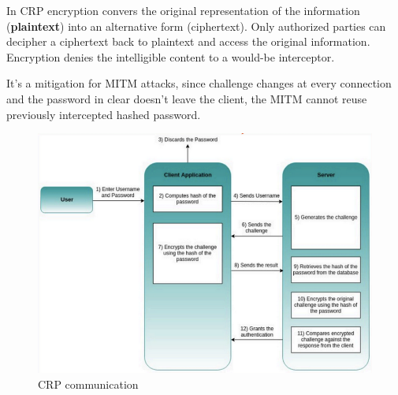     \FloatBarrier   
    
    In CRP encryption convers the original representation of the information (\textbf{plaintext}) into an alternative form (ciphertext). Only authorized parties can decipher a ciphertext back to plaintext and access the original information. Encryption denies the intelligible content to a would-be interceptor.
    
    It's a mitigation for MITM attacks, since challenge changes at every connection and the password in clear doesn't leave the client, the MITM cannot reuse previously intercepted hashed password.
    
    \begin{figure}[h!]
        \centering
        \includegraphics[scale=0.4]{images/CRP.png}
        \caption{CRP communication}
        \label{fig:CRP}
    \end{figure}
    
    \FloatBarrier   
    
